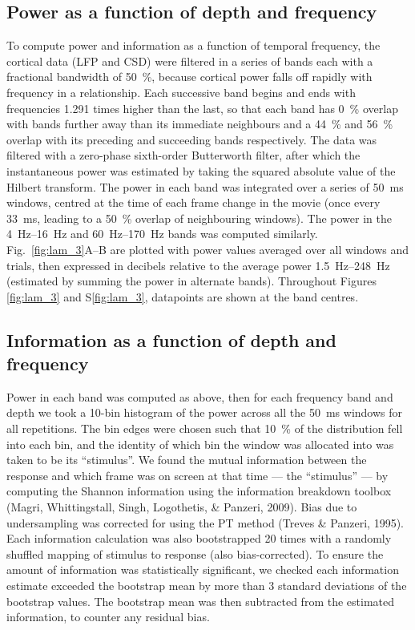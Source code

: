\subsection{Power as a function of depth and frequency}
To compute power and information as a function of temporal frequency, the cortical data (\ac{LFP} and \ac{CSD}) were filtered in a series of bands each with a fractional bandwidth of \SI{50}{\percent}, because cortical power falls off rapidly with frequency in a  relationship.
Each successive band begins and ends with frequencies 1.291 times higher than the last, so that each band has \SI{0}{\percent} overlap with bands further away than its immediate neighbours and a \SI{44}{\percent} and \SI{56}{\percent} overlap with its preceding and succeeding bands respectively.
The data was filtered with a zero-phase sixth-order Butterworth filter, after which the instantaneous power was estimated by taking the squared absolute value of the Hilbert transform.
The power in each band was integrated over a series of \SI{50}{ms} windows, centred at the time of each frame change in the movie (once every \SI{33}{ms}, leading to a \SI{50}{\percent} overlap of neighbouring windows).
The power in the \SIrange{4}{16}{Hz} and \SIrange{60}{170}{Hz} bands was computed similarly.
Fig.~\ref{fig:lam_3}A--B are plotted with power values averaged over all windows and trials, then expressed in decibels relative to the average power \SIrange{1.5}{248}{Hz} (estimated by summing the power in alternate bands).
Throughout Figures \ref{fig:lam_3} and S\ref{fig:lam_3}, datapoints are shown at the band centres.

\subsection{Information as a function of depth and frequency}
Power in each band was computed as above, then for each frequency band and depth we took a 10-bin histogram of the power across all the \SI{50}{ms} windows for all repetitions.
The bin edges were chosen such that \SI{10}{\percent} of the distribution fell into each bin, and the identity of which bin the window was allocated into was taken to be its ``stimulus''.
We found the mutual information between the response and which frame was on screen at that time --- the ``stimulus'' --- by computing the Shannon information using the information breakdown toolbox (Magri, Whittingstall, Singh, Logothetis, \& Panzeri, 2009).
Bias due to undersampling was corrected for using the \ac{PT} method (Treves \& Panzeri, 1995).
Each information calculation was also bootstrapped 20 times with a randomly shuffled mapping of stimulus to response (also bias-corrected).
To ensure the amount of information was statistically significant, we checked each information estimate exceeded the bootstrap mean by more than 3 standard deviations of the bootstrap values.
The bootstrap mean was then subtracted from the estimated information, to counter any residual bias.

